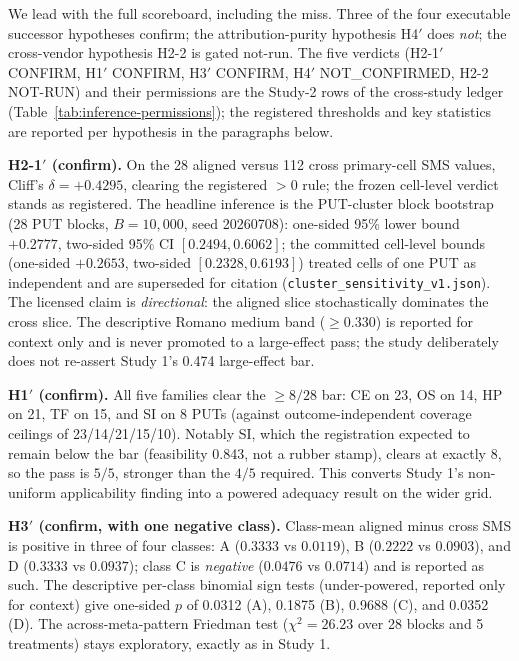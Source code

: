 \documentclass[manuscript,screen,review]{acmart}
\begin{document}
We lead with the full scoreboard, including the miss. Three of the four
executable successor hypotheses confirm; the attribution-purity
hypothesis H4\('\) does \emph{not}; the cross-vendor hypothesis H2-2 is
gated not-run. The five verdicts (H2-1\('\) CONFIRM, H1\('\) CONFIRM,
H3\('\) CONFIRM, H4\('\) NOT\_CONFIRMED, H2-2 NOT-RUN) and their permissions
are the Study-2 rows of the cross-study ledger
(Table~\ref{tab:inference-permissions}); the registered thresholds and key
statistics are reported per hypothesis in the paragraphs below.

\textbf{H2-1\('\) (confirm).} On the 28 aligned versus 112 cross
primary-cell SMS values, Cliff's \(\delta = +0.4295\), clearing the
registered \(>0\) rule; the frozen cell-level verdict stands as
registered. The headline inference is the PUT-cluster block bootstrap
(28 PUT blocks, \(B = 10{,}000\), seed 20260708): one-sided 95\% lower
bound \(+0.2777\), two-sided 95\% CI \([0.2494, 0.6062]\); the committed
cell-level bounds (one-sided \(+0.2653\), two-sided \([0.2328, 0.6193]\))
treated cells of one PUT as independent and are superseded for citation
(\texttt{cluster\_sensitivity\_v1.json}). The licensed claim
is \emph{directional}: the aligned slice stochastically dominates the
cross slice. The
descriptive Romano medium band (\(\geq 0.330\)) is reported for context
only and is never promoted to a large-effect pass; the study
deliberately does not re-assert Study 1's 0.474 large-effect bar.

\textbf{H1\('\) (confirm).} All five families clear the \(\geq 8/28\)
bar: CE on 23, OS on 14, HP on 21, TF on 15, and SI on 8 PUTs (against
outcome-independent coverage ceilings of 23/14/21/15/10). Notably SI,
which the registration expected to remain below the bar (feasibility
0.843, not a rubber stamp), clears at exactly 8, so the pass is
\(5/5\), stronger than the \(4/5\) required. This converts Study 1's
non-uniform applicability finding into a powered adequacy result on the
wider grid.

\textbf{H3\('\) (confirm, with one negative class).} Class-mean aligned
minus cross SMS is positive in three of four classes: A
(\(0.3333\) vs \(0.0119\)), B (\(0.2222\) vs \(0.0903\)), and D
(\(0.3333\) vs \(0.0937\)); class C is \emph{negative}
(\(0.0476\) vs \(0.0714\)) and is reported as such. The descriptive
per-class binomial sign tests (under-powered, reported only for context)
give one-sided \(p\) of 0.0312 (A), 0.1875 (B), 0.9688 (C), and 0.0352
(D). The across-meta-pattern Friedman test
(\(\chi^2 = 26.23\) over 28 blocks and 5 treatments) stays exploratory,
exactly as in Study 1.
\end{document}
